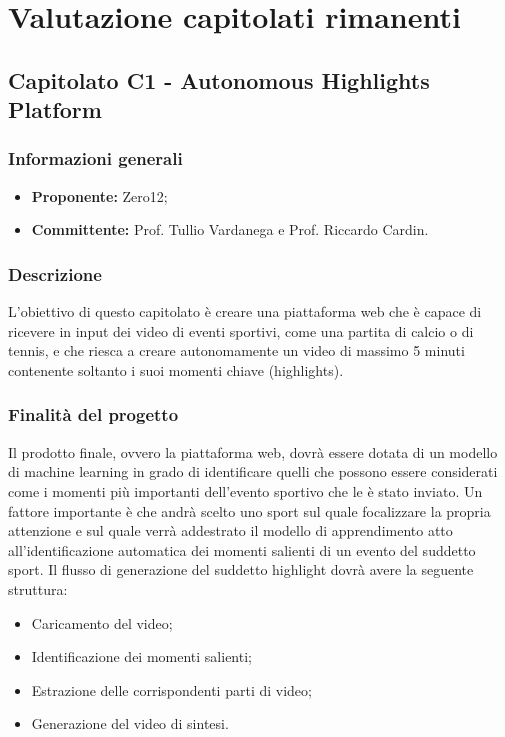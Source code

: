 

\section{Valutazione capitolati rimanenti}
    \subsection{Capitolato C1 - Autonomous Highlights Platform}
       \subsubsection{Informazioni generali}
       \begin{itemize}
           \item \textbf{Proponente: }Zero12;
           \item \textbf{Committente: }Prof. Tullio Vardanega e Prof. Riccardo Cardin.
       \end{itemize}

    \subsubsection{Descrizione}
        L'obiettivo di questo capitolato è creare una piattaforma web che è capace di ricevere in input dei video di eventi sportivi, come una partita di calcio o di tennis, e che riesca a creare autonomamente un video di massimo 5 minuti contenente soltanto i suoi momenti chiave (highlights). 
    
    \subsubsection{Finalità del progetto}
        Il prodotto finale, ovvero la piattaforma web, dovrà essere dotata di un modello di machine learning in grado di identificare quelli che possono essere considerati come i momenti più importanti dell'evento sportivo che le è stato inviato. Un fattore importante è che andrà scelto uno sport sul quale focalizzare la propria attenzione e sul quale verrà addestrato il modello di apprendimento atto all'identificazione automatica dei momenti salienti di un evento del suddetto sport.  
        Il flusso di generazione del suddetto highlight dovrà avere la seguente struttura:
        \begin{itemize}
            \item Caricamento del video; 
            \item Identificazione dei momenti salienti;
            \item Estrazione delle corrispondenti parti di video;
            \item Generazione del video di sintesi.
        \end{itemize}
